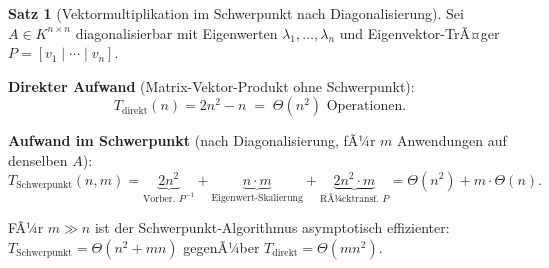 ﻿\documentclass[a4paper,12pt]{report}
\theoremstyle{definition}
\newtheorem{satz}{Satz}
\begin{document}
\begin{satz}[Vektormultiplikation im Schwerpunkt nach Diagonalisierung]
    \label{satz:diag-schwerpunkt}
    Sei $A \in K^{n \times n}$ diagonalisierbar mit Eigenwerten
    $\lambda_1, \ldots, \lambda_n$ und Eigenvektor-TrÃ¤ger
    $P = [v_1 \mid \cdots \mid v_n]$.

    \textbf{Direkter Aufwand} (Matrix-Vektor-Produkt ohne Schwerpunkt):
    \[
        T_{\mathrm{direkt}}(n) = 2n^2 - n \;=\; \Theta(n^2) \text{ Operationen}.
    \]

    \textbf{Aufwand im Schwerpunkt} (nach Diagonalisierung,
    fÃ¼r $m$ Anwendungen auf denselben $A$):
    \[
        T_{\mathrm{Schwerpunkt}}(n, m)
        = \underbrace{2n^2}_{\text{Vorber. } P^{-1}}
        + \underbrace{n \cdot m}_{\text{Eigenwert-Skalierung}}
        + \underbrace{2n^2 \cdot m}_{\text{RÃ¼cktransf. } P}
        = \Theta(n^2) + m \cdot \Theta(n).
    \]

    FÃ¼r $m \gg n$ ist der Schwerpunkt-Algorithmus asymptotisch
    effizienter: $T_{\mathrm{Schwerpunkt}} = \Theta(n^2 + mn)$
    gegenÃ¼ber $T_{\mathrm{direkt}} = \Theta(mn^2)$.
\end{satz}
\end{document}
